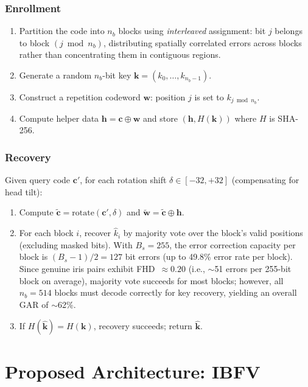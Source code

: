\documentclass[3p,twocolumn]{elsarticle}
\newcommand{\IBFV}{\textsf{IBFV}}
\begin{document}
\subsubsection{Enrollment}
\begin{enumerate}
    \item Partition the code into $n_b$ blocks using \emph{interleaved} assignment: bit $j$ belongs to block $(j \bmod n_b)$, distributing spatially correlated errors across blocks rather than concentrating them in contiguous regions.
    \item Generate a random $n_b$-bit key $\mathbf{k} = (k_0, \ldots, k_{n_b-1})$.
    \item Construct a repetition codeword $\mathbf{w}$: position $j$ is set to $k_{j \bmod n_b}$.
    \item Compute helper data $\mathbf{h} = \mathbf{c} \oplus \mathbf{w}$ and store $(\mathbf{h}, H(\mathbf{k}))$ where $H$ is SHA-256.
\end{enumerate}

\subsubsection{Recovery}
Given query code $\mathbf{c}'$, for each rotation shift $\delta \in [-32, +32]$ (compensating for head tilt):
\begin{enumerate}
    \item Compute $\tilde{\mathbf{c}} = \text{rotate}(\mathbf{c}', \delta)$ and $\tilde{\mathbf{w}} = \tilde{\mathbf{c}} \oplus \mathbf{h}$.
    \item For each block $i$, recover $\hat{k}_i$ by majority vote over the block's valid positions (excluding masked bits). With $B_s = 255$, the error correction capacity per block is $(B_s - 1)/2 = 127$ bit errors (up to 49.8\% error rate per block). Since genuine iris pairs exhibit FHD~$\approx 0.20$ (i.e., $\sim$51 errors per 255-bit block on average), majority vote succeeds for most blocks; however, all $n_b = 514$ blocks must decode correctly for key recovery, yielding an overall GAR of $\sim$62\%.
    \item If $H(\hat{\mathbf{k}}) = H(\mathbf{k})$, recovery succeeds; return $\hat{\mathbf{k}}$.
\end{enumerate}

\section{Proposed Architecture: \IBFV{}}
\label{sec:proposed}
\end{document}

